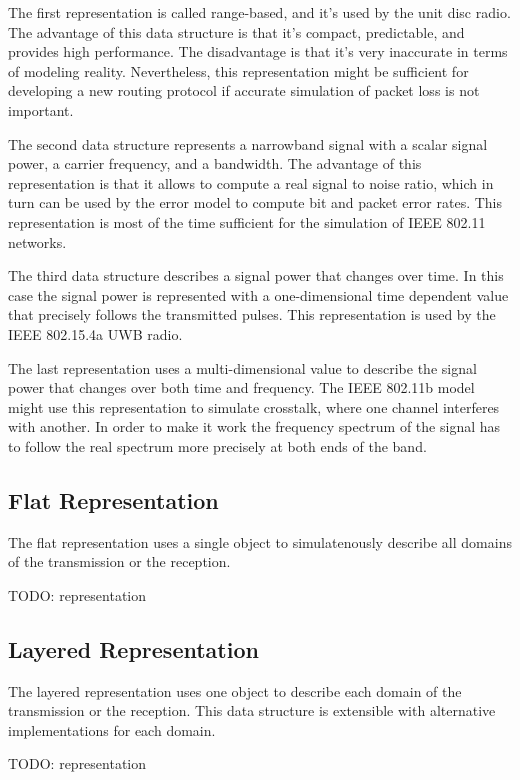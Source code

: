 The first representation is called range-based, and it's used by the unit disc
radio. The advantage of this data structure is that it's compact, predictable,
and provides high performance. The disadvantage is that it's very inaccurate in
terms of modeling reality. Nevertheless, this representation might be sufficient
for developing a new routing protocol if accurate simulation of packet loss is
not important.

The second data structure represents a narrowband signal with a scalar signal
power, a carrier frequency, and a bandwidth. The advantage of this
representation is that it allows to compute a real signal to noise ratio, which
in turn can be used by the error model to compute bit and packet error rates.
This representation is most of the time sufficient for the simulation of IEEE
802.11 networks.

The third data structure describes a signal power that changes over time. In
this case the signal power is represented with a one-dimensional time dependent
value that precisely follows the transmitted pulses. This representation is used
by the IEEE 802.15.4a UWB radio.

The last representation uses a multi-dimensional value to describe the signal
power that changes over both time and frequency. The IEEE 802.11b model might
use this representation to simulate crosstalk, where one channel interferes with
another. In order to make it work the frequency spectrum of the signal has to
follow the real spectrum more precisely at both ends of the band.

\subsection{Flat Representation}

The flat representation uses a single object to simulatenously describe all
domains of the transmission or the reception.

TODO: representation

\subsection{Layered Representation}

The layered representation uses one object to describe each domain of the
transmission or the reception. This data structure is extensible with
alternative implementations for each domain.

TODO: representation

